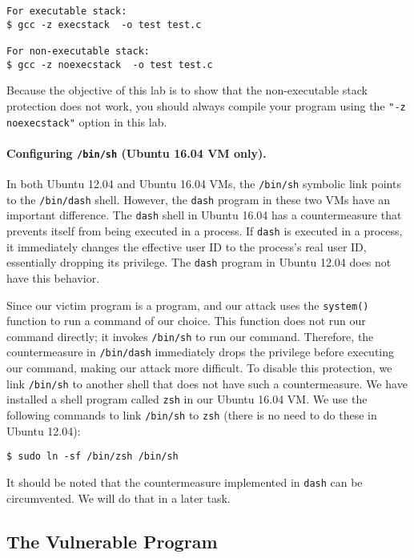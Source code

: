 \begin{lstlisting}
For executable stack:
$ gcc -z execstack  -o test test.c

For non-executable stack:
$ gcc -z noexecstack  -o test test.c
\end{lstlisting}



Because the objective of this lab is to show that the non-executable stack
protection does not work, you should always compile your program using the 
{\tt "-z noexecstack"} option in this lab.


\paragraph{Configuring \texttt{/bin/sh} (Ubuntu 16.04 VM only).} In both Ubuntu 12.04 and
Ubuntu 16.04 VMs, the \texttt{/bin/sh} symbolic link points to
the \texttt{/bin/dash} shell. However, the \texttt{dash} program
in these two VMs have an important difference.
The \texttt{dash} shell in Ubuntu 16.04 has a countermeasure
that prevents itself from being executed in a \setuid process.
If \texttt{dash} is 
executed in a \setuid process, it immediately
changes the effective user ID to the process's real user ID, essentially
dropping its privilege. The \texttt{dash} program in Ubuntu 12.04 does not have this
behavior.

Since our victim program is a \setuid program, and our
attack uses the \texttt{system()} function to run a command of our
choice. This function does not run our command directly; it 
invokes \texttt{/bin/sh} to run our command. Therefore, 
the countermeasure in \texttt{/bin/dash} immediately drops
the \setuid privilege before executing our command, making our 
attack more difficult. To disable this protection, 
we link \texttt{/bin/sh} to another shell that does not
have such a countermeasure.
We have installed a shell program
called \texttt{zsh} in our Ubuntu 16.04 VM. We use the following
commands to link \texttt{/bin/sh} to \texttt{zsh} (there is no need to do
these in Ubuntu 12.04):


\begin{lstlisting}
$ sudo ln -sf /bin/zsh /bin/sh
\end{lstlisting}


It should be noted that the countermeasure implemented in
\texttt{dash} can be circumvented. We will 
do that in a later task. 



\subsection{The Vulnerable Program}

